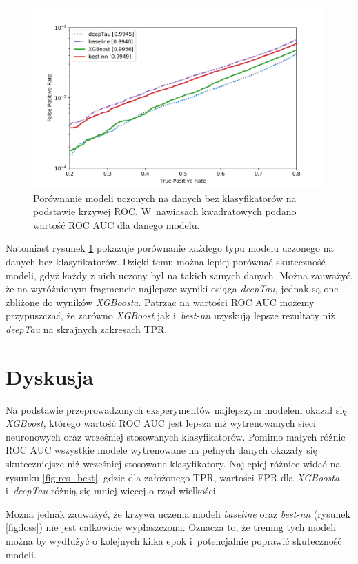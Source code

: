 \documentclass{pracalicmgr}
\begin{document}
	\begin{figure}
	\centering
	\includegraphics[width=1\textwidth]{without_disc.png}
	\caption{Porównanie modeli uczonych na danych bez klasyfikatorów na podstawie krzywej ROC. W~nawiasach kwadratowych podano wartość ROC AUC dla danego modelu.}
	\label{fig:res_disc}
	\end{figure}
	
	Natomiast rysunek \ref{fig:res_disc} pokazuje porównanie każdego typu modelu uczonego na danych bez klasyfikatorów. Dzięki temu można lepiej porównać skuteczność modeli, gdyż każdy z nich uczony był na takich samych danych. Można zauważyć, że na wyróżnionym fragmencie najlepsze wyniki osiąga \textit{deepTau}, jednak są one zbliżone do wyników \textit{XGBoosta}. Patrząc na wartości ROC AUC możemy przypuszczać, że zarówno \textit{XGBoost} jak i~\textit{best-nn} uzyskują lepsze rezultaty niż \textit{deepTau} na skrajnych zakresach TPR.
	
    
    \chapter{Dyskusja}
    
	Na podstawie przeprowadzonych eksperymentów najlepszym modelem okazał się \textit{XGBoost}, którego wartość ROC AUC jest lepsza niż wytrenowanych sieci neuronowych oraz wcześniej stosowanych klasyfikatorów. Pomimo małych różnic ROC AUC wszystkie modele wytrenowane na pełnych danych okazały się skuteczniejsze niż wcześniej stosowane klasyfikatory. Najlepiej różnice widać na rysunku \ref{fig:res_best}, gdzie dla założonego TPR, wartości FPR dla \textit{XGBoosta} i~\textit{deepTau} różnią się mniej więcej o rząd wielkości.    
    
     Można jednak zauważyć, że krzywa uczenia modeli \textit{baseline} oraz \textit{best-nn} (rysunek \ref{fig:loss}) nie jest całkowicie wypłaszczona. Oznacza to, że trening tych modeli można by wydłużyć o kolejnych kilka epok i~potencjalnie poprawić skuteczność modeli.
    
\end{document}
